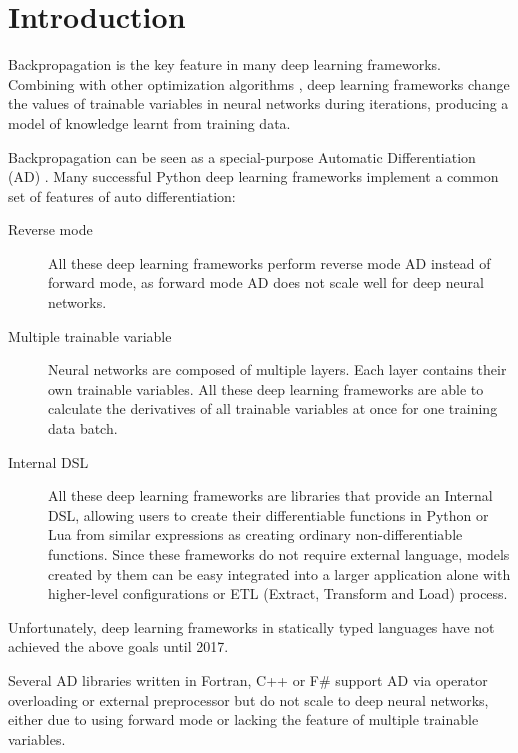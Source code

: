 \section{Introduction}
\label{introduction}

Backpropagation \cite{rumelhart1985learning} is the key feature in many deep learning frameworks. Combining with other optimization algorithms \cite{kingma2014adam, zeiler2012adadelta,duchi2011adaptive}, deep learning frameworks change the values of trainable variables in neural networks during iterations, producing a model of knowledge learnt from training data.

Backpropagation can be seen as a special-purpose Automatic Differentiation (AD) \cite{baydin2015automatic}. Many successful Python deep learning frameworks \cite{tokui2015chainer,google2017eager,paszke2017pytorch,neubig2017dynet} implement a common set of features of auto differentiation:

\begin{description}

  \item[Reverse mode] All these deep learning frameworks perform reverse mode AD instead of forward mode, as forward mode AD does not scale well for deep neural networks.

  \item[Multiple trainable variable] Neural networks are composed of multiple layers. Each layer contains their own trainable variables. All these deep learning frameworks are able to calculate the derivatives of all trainable variables at once for one training data batch.

  \item[Internal DSL \cite{fowler2010domain}] All these deep learning frameworks are libraries that provide an Internal DSL, allowing users to create their differentiable functions in Python or Lua from similar expressions as creating ordinary non-differentiable functions. Since these frameworks do not require external language, models created by them can be easy integrated into a larger application alone with higher-level configurations \cite{chollet2015keras} or ETL (Extract, Transform and Load) process.

\end{description}

Unfortunately, deep learning frameworks in statically typed languages have not achieved the above goals until 2017.

Several AD libraries \cite{bischof1992adifor,griewank1996algorithm,TapenadeRef13,baydin2015diffsharp} written in Fortran, C++ or F\# support AD via operator overloading or external preprocessor but do not scale to deep neural networks, either due to using forward mode or lacking the feature of multiple trainable variables.

